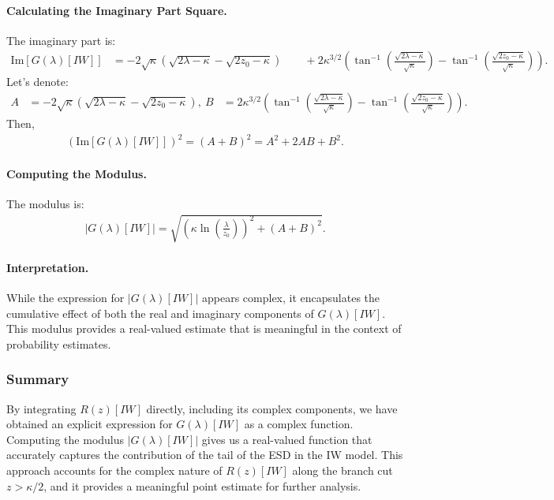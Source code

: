 \paragraph{Calculating the Imaginary Part Square.}

The imaginary part is:
\begin{align}
\text{Im}[ G(\lambda)[IW] ] &= - 2 \sqrt{ \kappa } \left( \sqrt{ 2 \lambda - \kappa } - \sqrt{ 2 z_0 - \kappa } \right ) \
&\quad + 2 \kappa^{ 3/2 } \left( \tan^{-1} \left( \frac{ \sqrt{ 2 \lambda - \kappa } }{ \sqrt{ \kappa } } \right ) - \tan^{-1} \left( \frac{ \sqrt{ 2 z_0 - \kappa } }{ \sqrt{ \kappa } } \right ) \right ).
\end{align}
%
Let’s denote:
\begin{align}
A &= - 2 \sqrt{ \kappa } \left( \sqrt{ 2 \lambda - \kappa } - \sqrt{ 2 z_0 - \kappa } \right ), \
B &= 2 \kappa^{ 3/2 } \left( \tan^{-1} \left( \frac{ \sqrt{ 2 \lambda - \kappa } }{ \sqrt{ \kappa } } \right ) - \tan^{-1} \left( \frac{ \sqrt{ 2 z_0 - \kappa } }{ \sqrt{ \kappa } } \right ) \right ).
\end{align}
%
Then,
\begin{align}
\left( \text{Im}[ G(\lambda)[IW] ] \right )^2 = (A + B)^2 = A^2 + 2AB + B^2.
\end{align}


\paragraph{Computing the Modulus.}

The modulus is:
\begin{align}
| G(\lambda)[IW] | = \sqrt{ \left( \kappa \ln \left( \frac{ \lambda }{ z_0 } \right ) \right )^2 + \left( A + B \right )^2 }.
\end{align}


\paragraph{Interpretation.}

While the expression for $| G(\lambda)[IW] |$ appears complex, it encapsulates the cumulative effect of both the real and imaginary components of $G(\lambda)[IW]$. This modulus provides a real-valued estimate that is meaningful in the context of probability estimates.


\subsubsection{Summary}

By integrating $R(z)[IW]$ directly, including its complex components, we have obtained an explicit expression for $G(\lambda)[IW]$ as a complex function. 
Computing the modulus $| G(\lambda)[IW] |$ gives us a real-valued function that accurately captures the contribution of the tail of the ESD in the IW model.
%
This approach accounts for the complex nature of $R(z)[IW]$ along the branch cut $z > \kappa/2$, and it provides a meaningful point estimate for further analysis.


